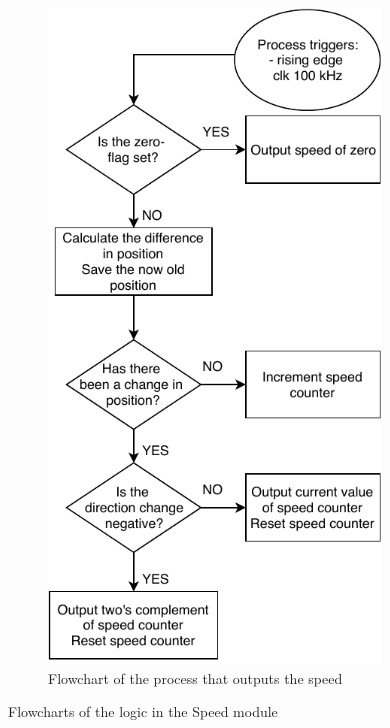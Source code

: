 \documentclass[../../main.tex]{subfiles}
\begin{document}
\begin{figure}[h]
\begin{subfigure}{0.48\textwidth}
    \includegraphics[width = 0.97\textwidth]{Sections/System_Implementation/Images/FPGAProcessSpeedOutputFlowchart.pdf}
    \caption{Flowchart of the process that outputs the speed}
    \label{subfig:FPGAProcessSpeedZeroFlowchart}
\end{subfigure}
\caption{Flowcharts of the logic in the Speed module}
\label{fig:FPGAProcessSpeedFlowcharts}
\end{figure}
\end{document}
